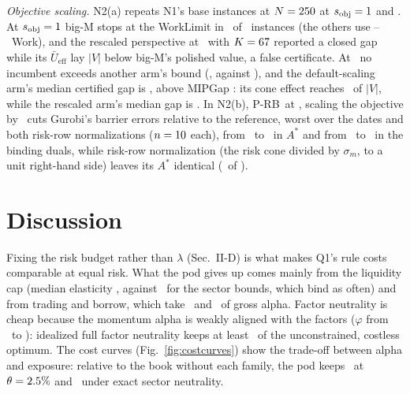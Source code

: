 \documentclass[conference]{IEEEtran}
\newcommand{\prb}{\mbox{P-RB}}
\newcommand{\Ub}{\bar U}
\begin{document}
\emph{Objective scaling.} N2(a) repeats N1's base instances at $N=250$ at $s_{\mathrm{obj}}=1$ and \SObj. At $s_{\mathrm{obj}}=1$ big-M stops at the WorkLimit in \NTwoBigMWLOne\ of \NTwoArmN\ instances (the others use \NTwoBigMWorkOneOkMin--\NTwoBigMWorkOneOkMax\ Work), and the rescaled perspective at \DIb\ with $K=67$ reported a closed gap while its $\Ub_{\mathrm{eff}}$ lay \FalseCertGap$|V|$ below big-M's polished value, a false certificate. At \SObj\ no incumbent exceeds another arm's bound (\NTwoBeatsScaled, against \NTwoBeatsOne), and the default-scaling arm's median certified gap is \NTwoDefGapScaled, above MIPGap \NTwoMipGap: its cone effect reaches \NTwoDefConeMax\ of $|V|$, while the rescaled arm's median gap is \NTwoRescGapScaled. In N2(b), \prb\ at \NTwoConvexDates, scaling the objective by \NTwoConvexScale\ cuts Gurobi's barrier errors relative to the reference, worst over the dates and both risk-row normalizations ($n=10$ each), from \BarrierRawA\ to \BarrierScaledA\ in $A^*$ and from \BarrierRawDual\ to \BarrierScaledDual\ in the binding duals, while risk-row normalization (the risk cone divided by $\sigma_m$, to a unit right-hand side) leaves its $A^*$ identical (\BarrierNormSame\ of \BarrierNormPairs).

\section{Discussion}
\label{sec:discussion}

Fixing the risk budget rather than $\lambda$ (Sec.~II-D) is what makes Q1's rule costs comparable at equal risk. What the pod gives up comes mainly from the liquidity cap (median elasticity \ELiqMed, against \ESectorMed\ for the sector bounds, which bind as often) and from trading and borrow, which take \SplitTradeMed\ and \SplitBorrowMed\ of gross alpha. Factor neutrality is cheap because the momentum alpha is weakly aligned with the factors ($\varphi$ from \PhiMomMin\ to \PhiMomMax): idealized full factor neutrality keeps at least \IdealRetMomMin\ of the unconstrained, costless optimum. The cost curves (Fig.~\ref{fig:costcurves}) show the trade-off between alpha and exposure: relative to the book without each family, the pod keeps \CTwoLiqTight\ at $\theta=2.5\%$ and \CTwoSectorTight\ under exact sector neutrality.
\end{document}
